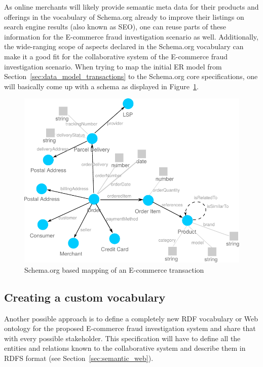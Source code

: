As online merchants will likely provide semantic meta data for their products and offerings in the vocabulary of Schema.org already to improve their listings on search engine results (also known as \gls{SEO}), one can reuse parts of these information for the \gls{E-commerce} fraud investigation scenario as well. Additionally, the wide-ranging scope of aspects declared in the Schema.org vocabulary can make it a good fit for the collaborative system of the \gls{E-commerce} fraud investigation scenario. When trying to map the initial \gls{ER} model from Section~\ref{sec:data_model_transactions} to the Schema.org core specifications, one will basically come up with a schema as displayed in Figure~\ref{fig:images_schema_org}. \@

\begin{figure}[H]
	\centering
		\includegraphics[width=0.8\columnwidth]{images/schema_org_mapping.pdf}
	\caption{Schema.org based mapping of an \gls{E-commerce} transaction}
\label{fig:images_schema_org}
\end{figure}


\subsection{Creating a custom vocabulary}
\label{subsec:build_ontology_frauds}

Another possible approach is to define a completely new \gls{RDF} vocabulary or Web ontology for the proposed \gls{E-commerce} fraud investigation system and share that with every possible stakeholder. This specification will have to define all the entities and relations known to the collaborative system and describe them in \gls{RDFS} format (see Section~\ref{sec:semantic_web}). \\

